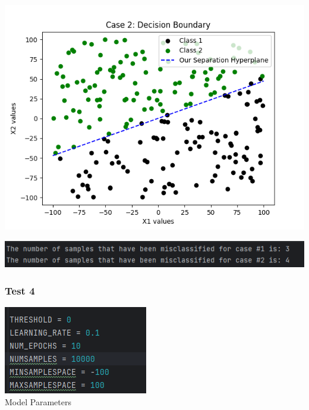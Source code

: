 \documentclass{article}
\begin{document}
\begin{center}
\includegraphics[scale=0.75]{../figs/T3.3.png} \\
\end{center}

\begin{center}
\includegraphics[scale=0.75]{../figs/T3.4.png} \\
\end{center}

\subsubsection{Test 4}

\begin{center}
\includegraphics[scale=0.75]{../figs/T4.1.png} \\
\caption{Model Parameters}
\end{center}
\end{document}
